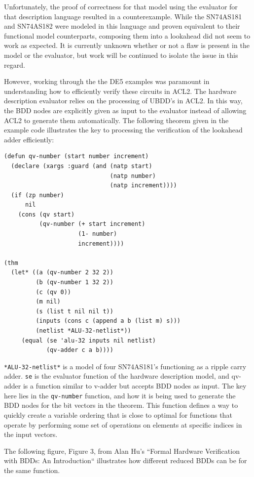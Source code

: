 \documentclass[fleqn,10pt]{SelfArx} %
\begin{document}
Unfortunately, the proof of correctness for that model using the evaluator for that description language resulted in a counterexample. While the SN74AS181 and SN74AS182 were modeled in this language and proven equivalent to their functional model counterparts, composing them into a lookahead did not seem to work as expected. It is currently unknown whether or not a flaw is present in the model or the evaluator, but work will be continued to isolate the issue in this regard.

However, working through the the DE5 examples was paramount in understanding how to efficiently verify these circuits in ACL2. The hardware description evaluator relies on the processing of UBDD's in ACL2. In this way, the BDD nodes are explicitly given as input to the evaluator instead of allowing ACL2 to generate them automatically. The following theorem given in the example code illustrates the key to processing the verification of the lookahead adder efficiently:

\begin{lstlisting}
(defun qv-number (start number increment)
  (declare (xargs :guard (and (natp start)
                              (natp number)
                              (natp increment))))
  (if (zp number)
      nil
    (cons (qv start)
          (qv-number (+ start increment) 
                     (1- number) 
                     increment))))

(thm
  (let* ((a (qv-number 2 32 2))
         (b (qv-number 1 32 2))
         (c (qv 0))
         (m nil)
         (s (list t nil nil t))
         (inputs (cons c (append a b (list m) s)))
         (netlist *ALU-32-netlist*))
     (equal (se 'alu-32 inputs nil netlist)
            (qv-adder c a b))))
\end{lstlisting}

\lstinline{*ALU-32-netlist*} is a model of four SN74AS181's functioning as a ripple carry adder. \lstinline{se} is the evaluator function of the hardware description model, and qv-adder is a function similar to v-adder but accepts BDD nodes as input. The key here lies in the \lstinline{qv-number} function, and how it is being used to generate the BDD nodes for the bit vectors in the theorem. This function defines a way to quickly create a variable ordering that is close to optimal for functions that operate by performing some set of operations on elements at specific indices in the input vectors.

The following figure, Figure 3, from Alan Hu's ``Formal Hardware Verification with BDDs: An Introduction``\cite{bdd} illustrates how different reduced BDDs can be for the same function. 
\end{document}
